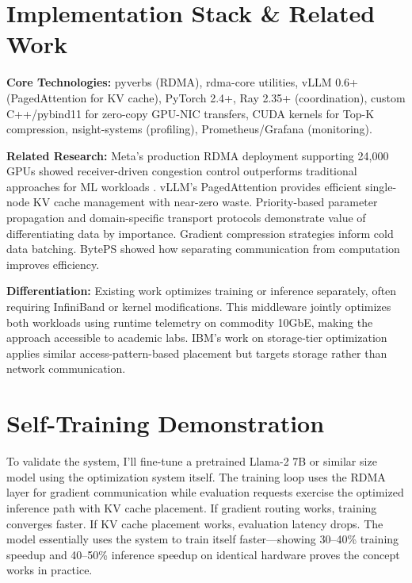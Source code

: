 \documentclass[10pt,letterpaper]{article}
\begin{document}
\section{Implementation Stack \& Related Work}

\textbf{Core Technologies:} pyverbs (RDMA), rdma-core utilities, vLLM 0.6+ (PagedAttention for KV cache), PyTorch 2.4+, Ray 2.35+ (coordination), custom C++/pybind11 for zero-copy GPU-NIC transfers, CUDA kernels for Top-K compression, nsight-systems (profiling), Prometheus/Grafana (monitoring).

\textbf{Related Research:} Meta's production RDMA deployment supporting 24,000 GPUs showed receiver-driven congestion control outperforms traditional approaches for ML workloads \cite{meta-rdma}. vLLM's PagedAttention \cite{vllm} provides efficient single-node KV cache management with near-zero waste. Priority-based parameter propagation \cite{p3} and domain-specific transport protocols \cite{mlt} demonstrate value of differentiating data by importance. Gradient compression strategies \cite{powersgd,accordion,lgreco} inform cold data batching. BytePS \cite{byteps} showed how separating communication from computation improves efficiency.

\textbf{Differentiation:} Existing work optimizes training \cite{meta-rdma,byteps,zero} or inference \cite{vllm,sglang,distserve} separately, often requiring InfiniBand or kernel modifications. This middleware jointly optimizes both workloads using runtime telemetry on commodity 10GbE, making the approach accessible to academic labs. IBM's work on storage-tier optimization \cite{ibm-storage} applies similar access-pattern-based placement but targets storage rather than network communication.

\section{Self-Training Demonstration}

To validate the system, I'll fine-tune a pretrained Llama-2 7B or similar size model using the optimization system itself. The training loop uses the RDMA layer for gradient communication while evaluation requests exercise the optimized inference path with KV cache placement. If gradient routing works, training converges faster. If KV cache placement works, evaluation latency drops. The model essentially uses the system to train itself faster---showing 30--40\% training speedup and 40--50\% inference speedup on identical hardware proves the concept works in practice.
\end{document}
